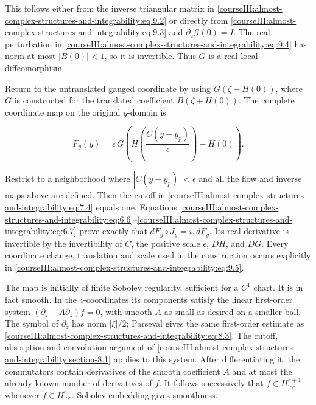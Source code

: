 This follows either from the inverse triangular matrix in \eqref{courseIII:almost-complex-structures-and-integrability:eq:9.2} or directly from \eqref{courseIII:almost-complex-structures-and-integrability:eq:9.3} and \(\partial_z\mathcal G(0)=I\). The real perturbation in \eqref{courseIII:almost-complex-structures-and-integrability:eq:9.4} has norm at most \(|B(0)|<1\), so it is invertible. Thus \(G\) is a real local diffeomorphism.

Return to the untranslated gauged coordinate by using \(G(\zeta-H(0))\), where \(G\) is constructed for the translated coefficient \(B(\zeta+H(0))\). The complete coordinate map on the original \(y\)-domain is

\begin{equation}
F_y(y)=\epsilon\,
G\left(H\left(\frac{C(y-y_p)}{\epsilon}\right)-H(0)\right).
\label{courseIII:almost-complex-structures-and-integrability:eq:9.5}
\end{equation}

Restrict to a neighborhood where \(|C(y-y_p)|<\epsilon\) and all the flow and inverse maps above are defined. Then the cutoff in \eqref{courseIII:almost-complex-structures-and-integrability:eq:7.4} equals one. Equations \eqref{courseIII:almost-complex-structures-and-integrability:eq:6.6}--\eqref{courseIII:almost-complex-structures-and-integrability:eq:6.7} prove exactly that \(dF_y\circ J_y=i,dF_y\). Its real derivative is invertible by the invertibility of \(C\), the positive scale \(\epsilon\), \(DH\), and \(DG\). Every coordinate change, translation and scale used in the construction occurs explicitly in \eqref{courseIII:almost-complex-structures-and-integrability:eq:9.5}.

The map is initially of finite Sobolev regularity, sufficient for a \(C^1\) chart. It is in fact smooth. In the \(z\)-coordinates its components satisfy the linear first-order system
\((\partial_{\bar z}-A\partial_z)f=0\), with smooth \(A\) as small as desired on a smaller ball. The symbol of \(\partial_{\bar z}\) has norm \(|\xi|/2\); Parseval gives the same first-order estimate as \eqref{courseIII:almost-complex-structures-and-integrability:eq:8.3}. The cutoff, absorption and convolution argument of \cref{courseIII:almost-complex-structures-and-integrability:section-8.1} applies to this system. After differentiating it, the commutators contain derivatives of the smooth coefficient \(A\) and at most the already known number of derivatives of \(f\). It follows successively that \(f\in H^{r+1}_{\mathrm{loc}}\) whenever \(f\in H^r_{\mathrm{loc}}\). Sobolev embedding gives smoothness.

